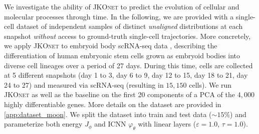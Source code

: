We investigate the ability of \textsc{JKOnet} to predict the evolution of cellular and molecular processes through time.
In the following, we are provided with a single-cell dataset of independent samples of distinct \emph{unaligned} distributions at each snapshot \textit{without} access to ground-truth single-cell trajectories. 
More concretely, we apply \textsc{JKOnet} to embryoid body sc\acrshort{RNA-seq} data \citep{moon2019visualizing}, describing the differentiation of human embryonic stem cells grown as embryoid bodies into diverse cell lineages over a period of 27 days. During this time, cells are collected at 5 different snapshots (day 1 to 3, day 6 to 9, day 12 to 15, day 18 to 21, day 24 to 27) and measured via scRNA-seq (resulting in $15,150$ cells).
We run \textsc{JKOnet} as well as the baseline on the first 20 components of a \acrfull{PCA} of the $4,000$ highly differentiable genes. More details on the dataset are provided in \cref{app:dataset_moon}.
We split the dataset into train and test data ($\sim 15 \%$) and parameterize both energy $J_\phi$ and ICNN $\varphi_\theta$ with linear layers ($\varepsilon = 1.0$, $\tau = 1.0$).


